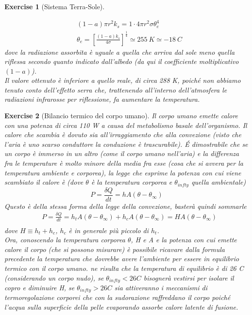 \documentclass[10pt,a4paper]{article}
\newtheorem{exercise}{Exercise}
\begin{document}
\begin{exercise}[Sistema Terra-Sole]
\begin{enumerate}
\begin{align*}
		&(1-a)\pi r^2 k_s = 1\cdot 4 \pi r^2 \sigma \theta_e^4\\
		&\theta_e = \left[\frac{(1-a)k_s}{4\sigma}\right]^{\frac{1}{4}}\simeq 255\ K \simeq -18\ C
	\end{align*}
dove la radiazione assorbita è uguale a quella che arriva dal sole meno quella riflessa secondo quanto indicato dall'albedo (da qui il coefficiente moltiplicativo \((1-a)\)).\\
Il valore ottenuto è inferiore a quello reale, di circa 288 \textdegree K, poiché non abbiamo tenuto conto dell'effetto serra che, trattenendo all'interno dell'atmosfera le radiazioni infrarosse per riflessione, fa aumentare la temperatura. 
\end{enumerate}
\end{exercise}

\begin{exercise}[Bilancio termico del corpo umano]
	Il corpo umano emette calore con una potenza di circa 110 W a causa del metabolismo basale dell'organismo. Il calore che scambia è dovuto sia all'irraggiamento che alla convezione (visto che l'aria è uno scarso conduttore la conduzione è trascurabile). \'{E} dimostrabile che se un corpo è immerso in un altro (come il corpo umano nell'aria) e la differenza fra le temperature è molto minore della media fra esse (cosa che si avvera per la temperatura ambiente e corporea), la legge che esprime la potenza con cui viene scambiato il calore è (dove $\theta$ è la temperatura corporea e $\theta_{infty}$ quella ambientale)
	\[P  = \frac{\delta Q}{dt} = h A (\theta - \theta_{\infty})\]
	Questo è della stessa forma della legge della convezione, basterà quindi sommarle
	\begin{align*}
		&P  = \frac{\delta Q}{dt} = h_t A (\theta - \theta_{\infty}) + h_c A (\theta - \theta_{\infty}) = H A (\theta - \theta_{\infty})\\
	\end{align*}
	dove $H \equiv h_t + h_c$, $h_c$ è in generale più piccolo di $h_t$.\\
	Ora, conoscendo la temperatura corporea $\theta$, H e A e la potenza con cui emette calore il corpo (che si possono misurare) è possibile ricavare dalla formula precedente la temperatura che dovrebbe avere l'ambiente per essere in equilibrio termico con il corpo umano. ne risulta che la temperatura di equilibrio è di 26 \textdegree C (considerando un corpo nudo), se $\theta_{infty} < 26 C $ bisognerà vestirsi per isolare il copro e diminuire H, se $\theta_{infty} > 26 C $ sia attiveranno i meccanismi di termoregolazione corporei che con la sudorazione raffreddano il corpo poiché l'acqua sulla superficie della pelle evaporando assorbe calore latente di fusione. 
\end{exercise}
\end{document}
